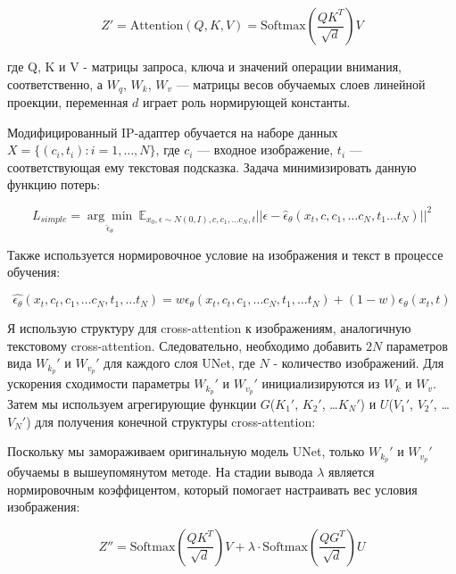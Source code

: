 \documentclass{article}
\begin{document}
\begin{equation}
Z' = \text{Attention}(Q, K, V) = \text{Softmax}\left(\frac{QK^T}{\sqrt{d}}\right)V
\end{equation}

где Q, K и V - матрицы запроса, ключа и значений операции внимания, соответственно, а \(W_q\), \(W_k\), \(W_v\) --- матрицы весов обучаемых слоев линейной проекции, переменная \(d\) играет роль нормирующей константы.


Модифицированный IP-адаптер обучается на наборе данных \(X = \{(c_i, t_i) : i = 1, \ldots, N\}\), где \(c_i\) --- входное изображение, \(t_i\) --- соответствующая ему текстовая подсказка. Задача минимизировать данную функцию потерь:

\begin{equation}
   L_{simple} = \underset{\hat\epsilon_{\theta}}{\arg\min}\ \mathbb{E}_{x_0, \epsilon \sim N(0, I), c, c_{1}, \ldots c_{N}, t} ||\epsilon - \hat{\epsilon}_{\theta}(x_t, c, c_{1}, \ldots c_{N}, t_{1} \ldots t_{N}) ||^2 
\end{equation}

Также используется нормировочное условие на изображения и текст в процессе обучения:

\begin{equation}
\hat{\epsilon_{\theta}}(x_{t}, c_{t}, c_{1}, \ldots c_{N}, t_{1},  \ldots t_{N}) = w \epsilon_{\theta}(x_{t}, c_{t}, c_{1}, \ldots c_{N}, t_{1} , \ldots t_{N}) + (1 - w) \epsilon_{\theta}(x_{t}, t)
\end{equation}

Я использую структуру для cross-attention к изображениям, аналогичную текстовому cross-attention. Следовательно, необходимо добавить \(2N\) параметров вида \(W_k_p'\) и \(W_v_p'\) для каждого слоя UNet, где \(N\) - количество изображений. Для ускорения сходимости параметры \(W_k_p'\) и \(W_v_p'\) инициализируются из \(W_k\) и \(W_v\). Затем мы используем агрегирующие функции \(G\)(\(K_{1}'\), \(K_{2}'\), \ldots \(K_{N}'\)) и \(U\)(\(V_{1}'\), \(V_{2}'\), \ldots \(V_{N}'\)) для получения конечной структуры cross-attention:

Поскольку мы замораживаем оригинальную модель UNet, только \(W_k_p'\) и \(W_v_p'\) обучаемы в вышеупомянутом методе.
На стадии вывода \(\lambda\) является нормировочным коэффицентом, который помогает настраивать вес условия изображения:

\begin{equation}
 Z'' = \text{Softmax}\left(\frac{QK^T}{\sqrt{d}}\right)V + \lambda \cdot \text{Softmax}\left(\frac{QG^T}{\sqrt{d}}\right)U
\end{equation}
\end{document}
